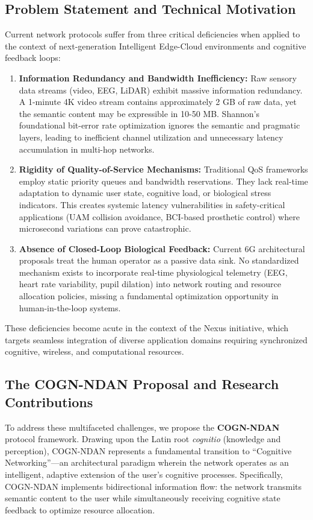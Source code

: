 \documentclass{BVP_CINC}
\newcommand{\COGN}{COGN-NDAN}
\begin{document}
\subsection{Problem Statement and Technical Motivation}
Current network protocols suffer from three critical deficiencies when applied to the context of next-generation Intelligent Edge-Cloud environments and cognitive feedback loops:
\begin{enumerate}
    \item \textbf{Information Redundancy and Bandwidth Inefficiency:} Raw sensory data streams (video, EEG, LiDAR) exhibit massive information redundancy. A 1-minute 4K video stream contains approximately 2 GB of raw data, yet the semantic content may be expressible in 10-50 MB. Shannon's foundational bit-error rate optimization ignores the semantic and pragmatic layers, leading to inefficient channel utilization and unnecessary latency accumulation in multi-hop networks.
    \item \textbf{Rigidity of Quality-of-Service Mechanisms:} Traditional QoS frameworks employ static priority queues and bandwidth reservations. They lack real-time adaptation to dynamic user state, cognitive load, or biological stress indicators. This creates systemic latency vulnerabilities in safety-critical applications (UAM collision avoidance, BCI-based prosthetic control) where microsecond variations can prove catastrophic.
    \item \textbf{Absence of Closed-Loop Biological Feedback:} Current 6G architectural proposals treat the human operator as a passive data sink. No standardized mechanism exists to incorporate real-time physiological telemetry (EEG, heart rate variability, pupil dilation) into network routing and resource allocation policies, missing a fundamental optimization opportunity in human-in-the-loop systems.
\end{enumerate}

These deficiencies become acute in the context of the Nexus initiative, which targets seamless integration of diverse application domains requiring synchronized cognitive, wireless, and computational resources.

\subsection{The COGN-NDAN Proposal and Research Contributions}
To address these multifaceted challenges, we propose the \textbf{COGN-NDAN} protocol framework. Drawing upon the Latin root \textit{cognitio} (knowledge and perception), \COGN{} represents a fundamental transition to ``Cognitive Networking''—an architectural paradigm wherein the network operates as an intelligent, adaptive extension of the user's cognitive processes. Specifically, \COGN{} implements bidirectional information flow: the network transmits semantic content to the user while simultaneously receiving cognitive state feedback to optimize resource allocation.
\end{document}
